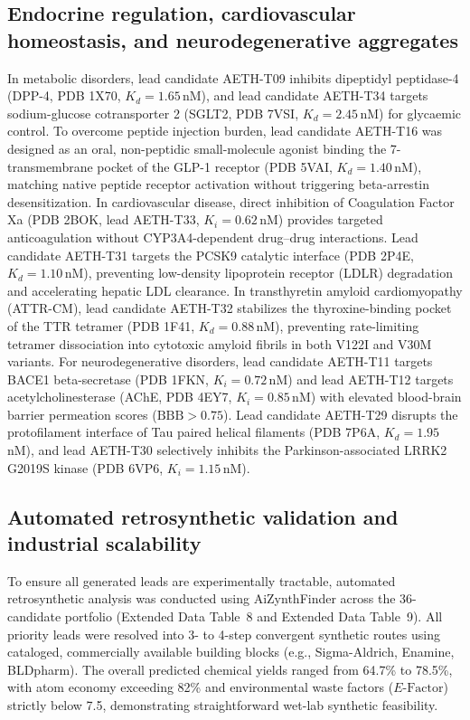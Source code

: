 \documentclass[11pt,a4paper]{article}
\begin{document}
\subsection*{Endocrine regulation, cardiovascular homeostasis, and neurodegenerative aggregates}
In metabolic disorders, lead candidate AETH-T09 inhibits dipeptidyl peptidase-4 (DPP-4, PDB 1X70, $K_d = 1.65$\,nM), and lead candidate AETH-T34 targets sodium-glucose cotransporter 2 (SGLT2, PDB 7VSI, $K_d = 2.45$\,nM) for glycaemic control. To overcome peptide injection burden, lead candidate AETH-T16 was designed as an oral, non-peptidic small-molecule agonist binding the 7-transmembrane pocket of the GLP-1 receptor (PDB 5VAI, $K_d = 1.40$\,nM), matching native peptide receptor activation without triggering beta-arrestin desensitization. In cardiovascular disease, direct inhibition of Coagulation Factor Xa (PDB 2BOK, lead AETH-T33, $K_i = 0.62$\,nM) provides targeted anticoagulation without CYP3A4-dependent drug--drug interactions. Lead candidate AETH-T31 targets the PCSK9 catalytic interface (PDB 2P4E, $K_d = 1.10$\,nM), preventing low-density lipoprotein receptor (LDLR) degradation and accelerating hepatic LDL clearance. In transthyretin amyloid cardiomyopathy (ATTR-CM), lead candidate AETH-T32 stabilizes the thyroxine-binding pocket of the TTR tetramer (PDB 1F41, $K_d = 0.88$\,nM), preventing rate-limiting tetramer dissociation into cytotoxic amyloid fibrils in both V122I and V30M variants. For neurodegenerative disorders, lead candidate AETH-T11 targets BACE1 beta-secretase (PDB 1FKN, $K_i = 0.72$\,nM) and lead AETH-T12 targets acetylcholinesterase (AChE, PDB 4EY7, $K_i = 0.85$\,nM) with elevated blood-brain barrier permeation scores ($\text{BBB} > 0.75$). Lead candidate AETH-T29 disrupts the protofilament interface of Tau paired helical filaments (PDB 7P6A, $K_d = 1.95$\,nM), and lead AETH-T30 selectively inhibits the Parkinson-associated LRRK2 G2019S kinase (PDB 6VP6, $K_i = 1.15$\,nM).

\subsection*{Automated retrosynthetic validation and industrial scalability}
To ensure all generated leads are experimentally tractable, automated retrosynthetic analysis was conducted using AiZynthFinder across the 36-candidate portfolio (Extended Data Table~8 and Extended Data Table~9). All priority leads were resolved into 3- to 4-step convergent synthetic routes using cataloged, commercially available building blocks (e.g., Sigma-Aldrich, Enamine, BLDpharm). The overall predicted chemical yields ranged from 64.7\% to 78.5\%, with atom economy exceeding 82\% and environmental waste factors ($E\text{-Factor}$) strictly below 7.5, demonstrating straightforward wet-lab synthetic feasibility.
\end{document}
